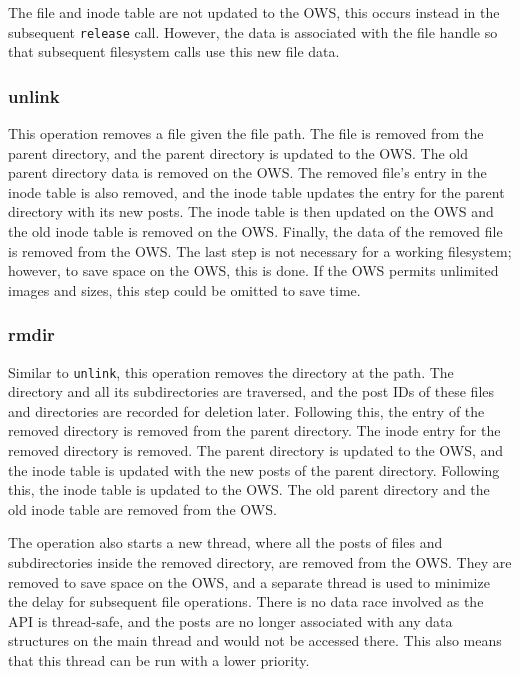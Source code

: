 The file and inode table are not updated to the \gls{OWS}, this occurs instead in the subsequent \texttt{release} call. However, the data is associated with the file handle so that subsequent filesystem calls use this new file data.

\subsubsection{unlink}
This operation removes a file given the file path. The file is removed from the parent directory, and the parent directory is updated to the \gls{OWS}. The old parent directory data is removed on the \gls{OWS}. The removed file's entry in the inode table is also removed, and the inode table updates the entry for the parent directory with its new posts. The inode table is then updated on the \gls{OWS} and the old inode table is removed on the \gls{OWS}. Finally, the data of the removed file is removed from the \gls{OWS}. The last step is not necessary for a working filesystem; however, to save space on the \gls{OWS}, this is done. If the \gls{OWS} permits unlimited images and sizes, this step could be omitted to save time.

\subsubsection{rmdir}
Similar to \texttt{unlink}, this operation removes the directory at the path. The directory and all its subdirectories are traversed, and the post IDs of these files and directories are recorded for deletion later. Following this, the entry of the removed directory is removed from the parent directory. The inode entry for the removed directory is removed. The parent directory is updated to the \gls{OWS}, and the inode table is updated with the new posts of the parent directory. Following this, the inode table is updated to the \gls{OWS}. The old parent directory and the old inode table are removed from the \gls{OWS}.

The operation also starts a new thread, where all the posts of files and subdirectories inside the removed directory, are removed from the \gls{OWS}. They are removed to save space on the \gls{OWS}, and a separate thread is used to minimize the delay for subsequent file operations. There is no data race involved as the \gls{API} is \mbox{thread-safe}, and the posts are no longer associated with any data structures on the main thread and would not be accessed there. This also means that this thread can be run with a lower priority.

